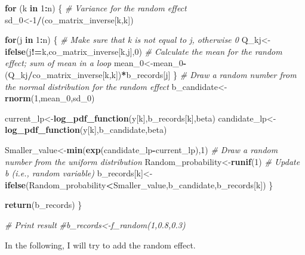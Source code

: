 \documentclass[]{book}
\newenvironment{Shaded}{\begin{snugshade}}{\end{snugshade}}
\newcommand{\KeywordTok}[1]{\textcolor[rgb]{0.13,0.29,0.53}{\textbf{#1}}}
\newcommand{\DecValTok}[1]{\textcolor[rgb]{0.00,0.00,0.81}{#1}}
\newcommand{\CommentTok}[1]{\textcolor[rgb]{0.56,0.35,0.01}{\textit{#1}}}
\newcommand{\ControlFlowTok}[1]{\textcolor[rgb]{0.13,0.29,0.53}{\textbf{#1}}}
\newcommand{\OperatorTok}[1]{\textcolor[rgb]{0.81,0.36,0.00}{\textbf{#1}}}
\newcommand{\NormalTok}[1]{#1}
\begin{document}
\begin{Shaded}
\begin{Highlighting}[]
\ControlFlowTok{for}\NormalTok{ (k }\ControlFlowTok{in} \DecValTok{1}\OperatorTok{:}\NormalTok{n)}
\NormalTok{ \{}
  \CommentTok{# Variance for the random effect}
\NormalTok{  sd_}\DecValTok{0}\NormalTok{<-}\DecValTok{1}\OperatorTok{/}\NormalTok{(co_matrix_inverse[k,k])}
  
  \ControlFlowTok{for}\NormalTok{(j }\ControlFlowTok{in} \DecValTok{1}\OperatorTok{:}\NormalTok{n)}
\NormalTok{      \{ }\CommentTok{# Make sure that k is not equal to j, otherwise 0}
\NormalTok{        Q_kj<-}\KeywordTok{ifelse}\NormalTok{(j}\OperatorTok{!=}\NormalTok{k,co_matrix_inverse[k,j],}\DecValTok{0}\NormalTok{)}
        \CommentTok{# Calculate the mean for the random effect; sum of mean in a loop}
\NormalTok{        mean_}\DecValTok{0}\NormalTok{<-mean_}\DecValTok{0}\OperatorTok{-}\NormalTok{(Q_kj}\OperatorTok{/}\NormalTok{co_matrix_inverse[k,k])}\OperatorTok{*}\NormalTok{b_records[j]}
\NormalTok{      \}}
  \CommentTok{# Draw a random number from the normal distribution for the random effect}
\NormalTok{  b_candidate<-}\KeywordTok{rnorm}\NormalTok{(}\DecValTok{1}\NormalTok{,mean_}\DecValTok{0}\NormalTok{,sd_}\DecValTok{0}\NormalTok{)}
  
\NormalTok{  current_lp<-}\KeywordTok{log_pdf_function}\NormalTok{(y[k],b_records[k],beta)}
\NormalTok{  candidate_lp<-}\KeywordTok{log_pdf_function}\NormalTok{(y[k],b_candidate,beta)}
  
\NormalTok{  Smaller_value<-}\KeywordTok{min}\NormalTok{(}\KeywordTok{exp}\NormalTok{(candidate_lp}\OperatorTok{-}\NormalTok{current_lp),}\DecValTok{1}\NormalTok{)}
  \CommentTok{# Draw a random number from the uniform distribution}
\NormalTok{  Random_probability<-}\KeywordTok{runif}\NormalTok{(}\DecValTok{1}\NormalTok{)}
  \CommentTok{# Update b (i.e., random variable)}
\NormalTok{  b_records[k]<-}\KeywordTok{ifelse}\NormalTok{(Random_probability}\OperatorTok{<}\NormalTok{Smaller_value,b_candidate,b_records[k])}
\NormalTok{\}}

\KeywordTok{return}\NormalTok{(b_records)}
\NormalTok{\}}

\CommentTok{# Print result}
\CommentTok{#b_records<-f_random(1,0.8,0.3) }
\end{Highlighting}
\end{Shaded}

In the following, I will try to add the random effect.
\end{document}
